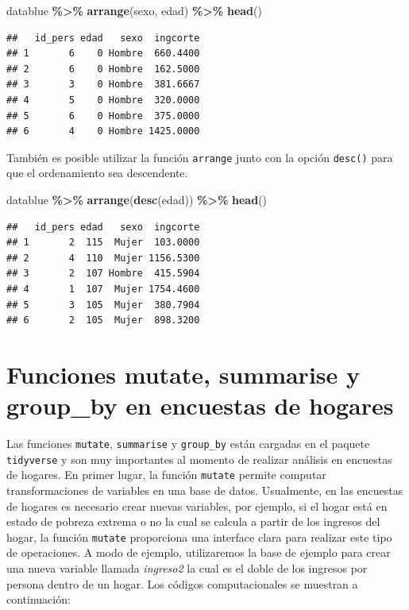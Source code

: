 \documentclass[
  spanish,
  12pt,
]{book}
\newenvironment{Shaded}{\begin{snugshade}}{\end{snugshade}}
\newcommand{\FunctionTok}[1]{\textcolor[rgb]{0.13,0.29,0.53}{\textbf{#1}}}
\newcommand{\NormalTok}[1]{#1}
\newcommand{\SpecialCharTok}[1]{\textcolor[rgb]{0.81,0.36,0.00}{\textbf{#1}}}
\begin{document}
\begin{Shaded}
\begin{Highlighting}[]
\NormalTok{datablue }\SpecialCharTok{\%\textgreater{}\%} \FunctionTok{arrange}\NormalTok{(sexo, edad) }\SpecialCharTok{\%\textgreater{}\%} \FunctionTok{head}\NormalTok{()}
\end{Highlighting}
\end{Shaded}

\begin{verbatim}
##   id_pers edad   sexo  ingcorte
## 1       6    0 Hombre  660.4400
## 2       6    0 Hombre  162.5000
## 3       3    0 Hombre  381.6667
## 4       5    0 Hombre  320.0000
## 5       6    0 Hombre  375.0000
## 6       4    0 Hombre 1425.0000
\end{verbatim}

También es posible utilizar la función \texttt{arrange} junto con la opción \texttt{desc()} para que el ordenamiento sea descendente.

\begin{Shaded}
\begin{Highlighting}[]
\NormalTok{datablue }\SpecialCharTok{\%\textgreater{}\%} \FunctionTok{arrange}\NormalTok{(}\FunctionTok{desc}\NormalTok{(edad)) }\SpecialCharTok{\%\textgreater{}\%} \FunctionTok{head}\NormalTok{()}
\end{Highlighting}
\end{Shaded}

\begin{verbatim}
##   id_pers edad   sexo  ingcorte
## 1       2  115  Mujer  103.0000
## 2       4  110  Mujer 1156.5300
## 3       2  107 Hombre  415.5904
## 4       1  107  Mujer 1754.4600
## 5       3  105  Mujer  380.7904
## 6       2  105  Mujer  898.3200
\end{verbatim}

\section{\texorpdfstring{Funciones \textbf{mutate, summarise y group\_by} en encuestas de hogares}{Funciones mutate, summarise y group\_by en encuestas de hogares}}\label{funciones-mutate-summarise-y-group_by-en-encuestas-de-hogares}

Las funciones \texttt{mutate}, \texttt{summarise} y \texttt{group\_by} están cargadas en el paquete \texttt{tidyverse} y son muy importantes al momento de realizar análisis en encuestas de hogares. En primer lugar, la función \texttt{mutate} permite computar transformaciones de variables en una base de datos. Usualmente, en las encuestas de hogares es necesario crear nuevas variables, por ejemplo, si el hogar está en estado de pobreza extrema o no la cual se calcula a partir de los ingresos del hogar, la función \texttt{mutate} proporciona una interface clara para realizar este tipo de operaciones. A modo de ejemplo, utilizaremos la base de ejemplo para crear una nueva variable llamada \emph{ingreso2} la cual es el doble de los ingresos por persona dentro de un hogar. Los códigos computacionales se muestran a continuación:
\end{document}
